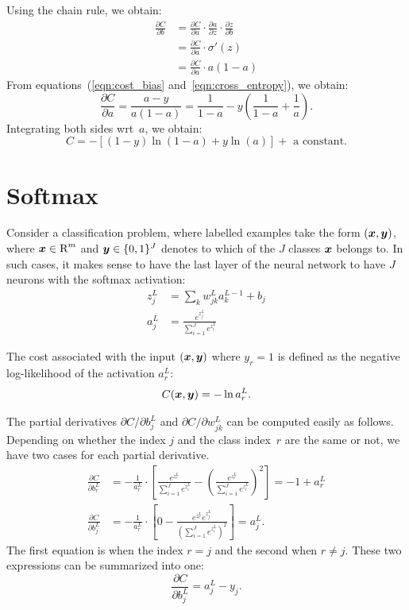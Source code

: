 Using the chain rule, we obtain:
\begin{align}
    \frac{\partial C}{\partial b} & = 
        \frac{\partial C}{\partial a} \cdot 
        \frac{\partial a}{\partial z} \cdot 
        \frac{\partial z}{\partial b} \nonumber \\
        & = \frac{\partial C}{\partial a} \cdot \sigma'(z) \nonumber \\ 
        & = \frac{\partial C}{\partial a} \cdot a (1 - a) \label{eqn:cross_entropy} 
\end{align}
From equations~(\ref{eqn:cost_bias} and~\ref{eqn:cross_entropy}), we obtain:
\[
    \frac{\partial C}{\partial a} = \frac{a - y}{a (1 - a)} = 
        \frac{1}{1 - a} - y \left ( \frac{1}{1 - a} + \frac{1}{a}\right ).
\]
Integrating both sides wrt~$a$, we obtain:
\[
    C = - [(1 - y) \ln (1 - a) + y \ln (a)] + \text{ a constant}.
\]

\section{Softmax}

Consider a classification problem, where labelled examples take the form 
$(\boldsymbol{x}, \boldsymbol{y})$, where $\boldsymbol{x} \in \text{R}^m$ and $\boldsymbol{y} \in \{0, 1\}^J$ 
denotes to which of the $J$ classes $\boldsymbol{x}$ belongs to. 
In such cases, it makes sense to have the last 
layer of the neural network to have $J$ neurons with the softmax activation:
\begin{align*}
    z_j^L & = \sum_k w_{j k}^L a_{k}^{L - 1} + b_j \\
    a_j^L & = \frac{e^{z_j^L}}{ \sum_{i = 1}^J e^{z_i^L}}
\end{align*}

The cost associated with the input $(\boldsymbol{x}, \boldsymbol{y})$ where $y_r = 1$ 
is defined as the negative log-likelihood of the activation $a_{r}^L$:
\[
    C(\boldsymbol{x}, \boldsymbol{y}) = - \ln a_{r}^L.
\]

The partial derivatives $\partial C / \partial b_j^L$ and   $\partial C / \partial w_{j k}^L$
can be computed easily as follows. Depending on whether the index $j$ and the class index~$r$
are the same or not, we have two cases for each partial derivative.
\begin{align}
    \frac{\partial C}{\partial b_{r}^L} 
        & =   - \frac{1}{a_{r}^L} \cdot 
            \left [ \frac{e^{z_{r}^L}}{ \sum_{i = 1}^J e^{z_i^L}} - 
                    \left ( \frac{e^{z_{r}^L}}{ \sum_{i = 1}^J e^{z_i^L}} \right )^2 
            \right ] = - 1 + a_{r}^L \\
\frac{\partial C}{\partial b_j^L} 
      & = 
    - \frac{1}{a_{r}^L} \cdot \left [ 0 - \frac{e^{z_{r}^L} e^{z_j^L}}{ \left ( \sum_{i = 1}^J e^{z_i^L} \right )^2} 
                            \right ] = a_j^L. 
\end{align}
The first equation is when the index $r = j$ and the second when $r \neq j$. 
These two expressions can be summarized into one: 
\begin{equation}
\frac{\partial C}{\partial b_j^L} = a_{j}^L - y_j.
\end{equation}

